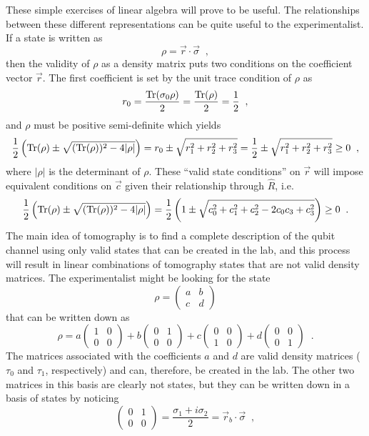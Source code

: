 These simple exercises of linear algebra will prove to be useful.  The relationships between these different representations can be quite useful to the experimentalist.  If a state is written as
$$
\rho = \vec{r}\cdot\vec{\sigma}\;\;,
$$
then the validity of $\rho$ as a density matrix puts two conditions on the coefficient vector $\vec{r}$.  The first coefficient is set by the unit trace condition of $\rho$ as
$$
r_0 = \frac{\operatorname{Tr}(\sigma_0 \rho)}{2} = \frac{\operatorname{Tr}(\rho)}{2} = \frac{1}{2}\;\;,
$$  
and $\rho$ must be positive semi-definite which yields
$$
\frac{1}{2}\left(\operatorname{Tr}(\rho)\pm\sqrt{(\operatorname{Tr}(\rho))^2-4|\rho|}\right)=r_0\pm\sqrt{r_1^2+r_2^2+r_3^2} = \frac{1}{2}\pm\sqrt{r_1^2+r_2^2+r_3^2} \ge 0\;\;,
$$
where $|\rho|$ is the determinant of $\rho$.  These ``valid state conditions'' on $\vec{r}$ will impose equivalent conditions on $\vec{c}$ given their relationship through $\hat{R}$, i.e.\
$$
\frac{1}{2}\left(\operatorname{Tr}(\rho)\pm\sqrt{(\operatorname{Tr}(\rho))^2-4|\rho|}\right)=\frac{1}{2}\left(1\pm\sqrt{c_0^2 + c_1^2 + c_2^2 - 2 c_0 c_3 + c_3^2}\right)\ge 0\;\;.
$$
The main idea of tomography is to find a complete description of the qubit channel using only valid states that can be created in the lab, and this process will result in linear combinations of tomography states that are not valid density matrices.  The experimentalist might be looking for the state
$$
\rho = \begin{pmatrix}
a & b\\
c & d
\end{pmatrix}
$$
that can be written down as
$$
\rho = a\begin{pmatrix}
1 & 0\\
0 & 0
\end{pmatrix}+b\begin{pmatrix}
0 & 1\\
0 & 0
\end{pmatrix}+c\begin{pmatrix}
0 & 0\\
1 & 0
\end{pmatrix}+d\begin{pmatrix}
0 & 0\\
0 & 1
\end{pmatrix}\;\;.
$$
The matrices associated with the coefficients $a$ and $d$ are valid density matrices ($\tau_0$ and $\tau_1$, respectively) and can, therefore, be created in the lab.  The other two matrices in this basis are clearly not states, but they can be written down in a basis of states by noticing
$$
\begin{pmatrix}
0 & 1\\
0 & 0
\end{pmatrix} = \frac{\sigma_1+i\sigma_2}{2} = \vec{r}_b\cdot\vec{\sigma}\;\;,
$$

